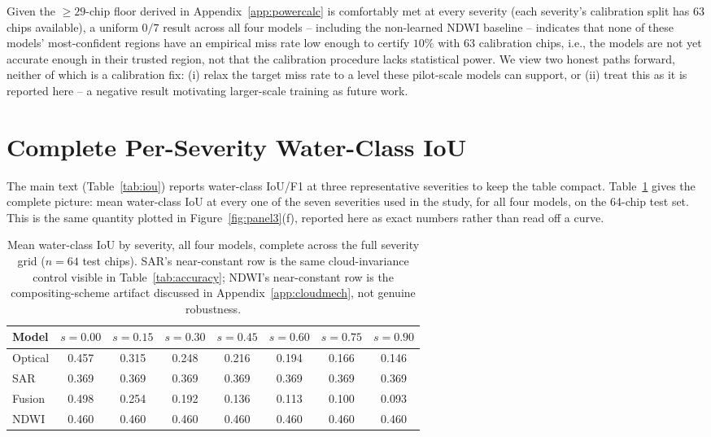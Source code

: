 \documentclass{article}
\begin{document}
Given the $\ge\!29$-chip floor derived in Appendix~\ref{app:powercalc} is comfortably met at every severity (each severity's calibration split has $63$ chips available), a uniform $0/7$ result across all four models -- including the non-learned NDWI baseline -- indicates that none of these models' most-confident regions have an empirical miss rate low enough to certify $10\%$ with $63$ calibration chips, i.e., the models are not yet accurate enough in their trusted region, not that the calibration procedure lacks statistical power. We view two honest paths forward, neither of which is a calibration fix: (i) relax the target miss rate to a level these pilot-scale models can support, or (ii) treat this as it is reported here -- a negative result motivating larger-scale training as future work.

\section{Complete Per-Severity Water-Class IoU}
\label{app:fulliou}

The main text (Table~\ref{tab:iou}) reports water-class IoU/F1 at three representative severities to keep the table compact. Table~\ref{tab:iou_full} gives the complete picture: mean water-class IoU at every one of the seven severities used in the study, for all four models, on the 64-chip test set. This is the same quantity plotted in Figure~\ref{fig:panel3}(f), reported here as exact numbers rather than read off a curve.

\begin{table}[h]
\centering
\caption{Mean water-class IoU by severity, all four models, complete across the full severity grid ($n{=}64$ test chips). SAR's near-constant row is the same cloud-invariance control visible in Table~\ref{tab:accuracy}; NDWI's near-constant row is the compositing-scheme artifact discussed in Appendix~\ref{app:cloudmech}, not genuine robustness.}
\label{tab:iou_full}
\footnotesize
\renewcommand{\arraystretch}{0.95}
\begin{tabular}{lccccccc}
\toprule
Model & $s{=}0.00$ & $s{=}0.15$ & $s{=}0.30$ & $s{=}0.45$ & $s{=}0.60$ & $s{=}0.75$ & $s{=}0.90$ \\
\midrule
Optical & 0.457 & 0.315 & 0.248 & 0.216 & 0.194 & 0.166 & 0.146 \\
SAR & 0.369 & 0.369 & 0.369 & 0.369 & 0.369 & 0.369 & 0.369 \\
Fusion & 0.498 & 0.254 & 0.192 & 0.136 & 0.113 & 0.100 & 0.093 \\
NDWI & 0.460 & 0.460 & 0.460 & 0.460 & 0.460 & 0.460 & 0.460 \\
\bottomrule
\end{tabular}
\end{table}
\end{document}
